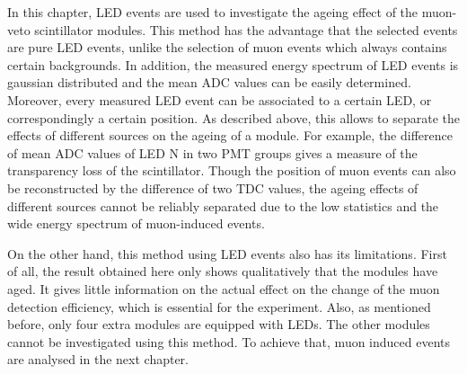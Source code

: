 In this chapter, LED events are used to investigate the ageing effect of the muon-veto scintillator modules. This method has the advantage that the selected events are pure LED events, unlike the selection of muon events which always contains certain backgrounds. In addition, the measured energy spectrum of LED events is gaussian distributed and the mean ADC values can be easily determined. \\
Moreover, every measured LED event can be associated to a certain LED, or correspondingly a certain position. As described above, this allows to separate the effects of different sources on the ageing of a module. For example, the difference of mean ADC values of LED N in two PMT groups gives a measure of the transparency loss of the scintillator. Though the position of muon events can also be reconstructed by the difference of two TDC values, the ageing effects of different sources cannot be reliably separated due to the low statistics and the wide energy spectrum of muon-induced events.

On the other hand, this method using LED events also has its limitations. First of all, the result obtained here only shows qualitatively that the modules have aged. It gives little information on the actual effect on the change of the muon detection efficiency, which is essential for the experiment. Also, as mentioned before, only four extra modules are equipped with LEDs. The other modules cannot be investigated using this method. To achieve that, muon induced events are analysed in the next chapter.





